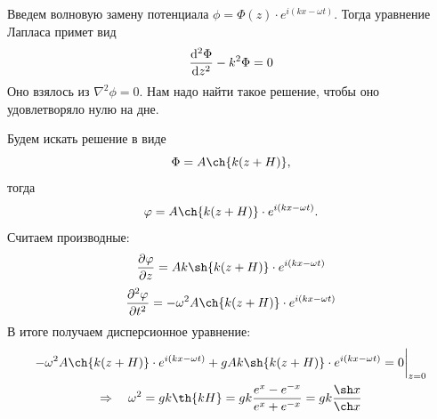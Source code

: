 Введем волновую замену потенциала $\phi=\Phi(z)\cdot e^{i(kx- \omega t)}$. Тогда уравнение Лапласа примет вид
\begin{equation}
	\dv[2]{\Phi}{z}-k^2\Phi=0
\end{equation}
Оно взялось из $\nabla^2\phi=0$. Нам надо найти такое решение, чтобы оно удовлетворяло нулю на дне. 

Будем искать решение в виде
\begin{equation}
	\Phi=A\ch{k(z+H)},
\end{equation}
тогда
\begin{equation}
	\phi=A\ch{k(z+H)}\cdot e^{i(kx- \omega t)}.
\end{equation}
Считаем производные:
\begin{equation}
	\pdv{\phi}{z}=Ak\sh{k(z+H)}\cdot e^{i(kx- \omega t)}
\end{equation}
\begin{equation}
	\pdv[2]{\phi}{t}=-\omega^2A\ch{k(z+H)}\cdot e^{i(kx- \omega t)}
\end{equation}
В итоге получаем дисперсионное уравнение:
\begin{gather}
	\label{eq:disp}
	-\omega^2A\ch{k(z+H)}\cdot e^{i(kx- \omega t)}+gAk\sh{k(z+H)}\cdot e^{i(kx- \omega t)}=0 \bigg|_{z=0}
	\\ \Rightarrow \quad
	\omega^2=gk\th{kH} = gk \frac{e^x-e^{-x}}{e^{x}+e^{-x}} = gk\frac{\sh x}{\ch x}
\end{gather}






